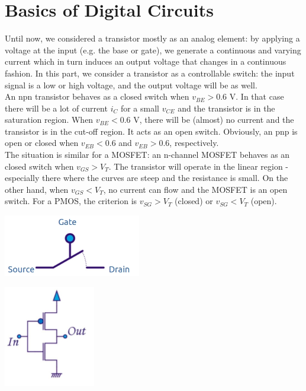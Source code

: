 \chapter{Basics of Digital Circuits}
\label{ch:digital}
Until now, we considered a transistor mostly as an analog element: by applying a voltage at the input (e.g. the base or gate), we generate a continuous and varying current which in turn induces an output voltage that changes in a continuous fashion. In this part, we consider a transistor as a controllable switch: the input signal is a low or high voltage, and the output voltage will be as well.\\
An npn transistor behaves as a closed switch when $v_{BE} > 0.6$ V. In that case there will be a lot of current $i_C$ for a small $v_{CE}$ and the transistor is in the saturation region. When $v_{BE} < 0.6$ V, there will be (almost) no current and the transistor is in the cut-off region. It acts as an open switch. Obviously, an pnp is open or closed when $v_{EB} < 0.6$ and $v_{EB} > 0.6$, respectively.\\
The situation is similar for a MOSFET: an n-channel MOSFET behaves as an closed switch when $v_{GS} > V_T$. The transistor will operate in the linear region - especially there where the curves are steep and the resistance is small. On the other hand, when $v_{GS} < V_T$, no current can flow and the MOSFET is an open switch. For a PMOS, the criterion is $v_{SG} > V_T$ (closed) or  $v_{SG} < V_T$ (open).

\begin{minipage}{.5\textwidth}
	\centering
	\includegraphics[width=6cm]{figures/ch13/switch.jpg}
	\label{fig:switch}
\end{minipage}%
\begin{minipage}{.5\textwidth}
	\centering
	\includegraphics[width=4cm]{figures/ch13/not_gate.jpg}
	\label{fig:not_gate}
\end{minipage}

